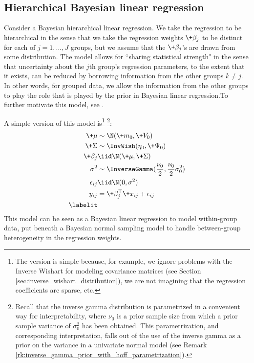\documentclass{article} %
\newcommand{\naturalParam}{\eta}
\begin{document}
\subsection{Hierarchical Bayesian linear regression} \label{sec:hierarchial_linear_regression}

Consider a Bayesian hierarchical linear regression.    We take the regression to be hierarchical in the sense that we take the regression weights $\+\beta_j$ to be distinct for each of $j=1,...,J$ groups,  but we assume that the $\+\beta_j$'s are drawn from some distribution.     The model allows for ``sharing statistical strength" in the sense that uncertainty about the $j$th group's regression parameters,  to the extent that it exists,  can be reduced by borrowing information from the other groups $k \neq j$.    In other words,  for grouped data,  we allow the information from the other groups to play the role that is played by the prior in Bayesian linear regression.To further motivate this model,  see \cite{hoff2009first}.

A simple version of this model is\footnote{The version is simple because,  for example,   we ignore problems with the Inverse Wishart for modeling covariance matrices (see Section \ref{sec:inverse_wishart_distribution}),  we are not imagining that the regression coefficients are sparse,  etc.} \footnote{Recall that the inverse gamma distribution is parametrized in a convenient way for interpretability,  where $\nu_0$ is a prior sample size from which a  prior sample variance of $\sigma_0^2$ has been obtained.  This parametrization,  and corresponding interpretation,  falls out of the use of the inverse gamma as a prior on the variance in a univariate normal model (see Remark \ref{rk:inverse_gamma_prior_with_hoff_parametrization}). }:
\begin{align*}
\+\mu &\sim  \N (\+m_0,\+V_0) \\
\+\Sigma &\sim \InvWish(\naturalParam_0,  \+\Psi_0) \\
\+\beta_j &\iid \N(\+\mu,  \+\Sigma) \\
\sigma^2 &\sim \InverseGamma (\frac{\nu_0}{2}, \frac{\nu_0}{2} \sigma_0^2) \\
\epsilon_{ij} &\iid \N(0, \sigma^2) \\
y_{ij} &= \+\beta_j^\top \+x_{ij} + \epsilon_{ij} \\
\labelit \label{eqn:hierarchical_linear_regression}
\end{align*}
This model can be seen as a Bayesian linear regression to model within-group data,  put beneath a Bayesian normal sampling model to handle between-group heterogeneity in the regression weights. 
 
\end{document}

